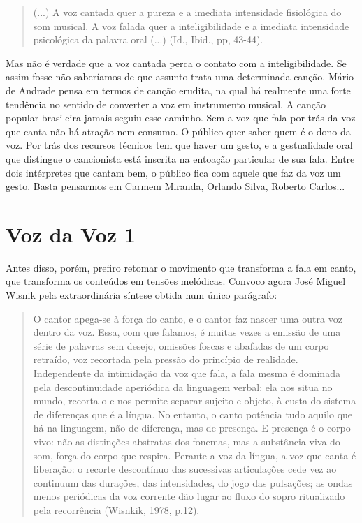 \begin{quote}
(...) A voz cantada quer a pureza e a imediata intensidade fisiológica
do som musical. A voz falada quer a inteligibilidade e a imediata
intensidade psicológica da palavra oral (...) (Id., Ibid., pp, 43-44).
\end{quote}

Mas não é verdade que a voz cantada perca o contato com a
inteligibilidade. Se assim fosse não saberíamos de que assunto trata uma
determinada canção. Mário de Andrade pensa em termos de canção erudita,
na qual há realmente uma forte tendência no sentido de converter a voz
em instrumento musical. A canção popular brasileira jamais seguiu esse
caminho. Sem a voz que fala por trás da voz que canta não há atração nem
consumo. O público quer saber quem é o dono da voz. Por trás dos
recursos técnicos tem que haver um gesto, e a gestualidade oral que
distingue o cancionista está inscrita na entoação particular de sua
fala. Entre dois intérpretes que cantam bem, o público fica com aquele
que faz da voz um gesto. Basta pensarmos em Carmem Miranda, Orlando
Silva, Roberto Carlos...

\section{Voz da Voz 1}

Antes disso, porém, prefiro retomar o movimento que transforma a fala em
canto, que transforma os conteúdos em tensões melódicas. Convoco agora
José Miguel Wisnik pela extraordinária síntese obtida num único
parágrafo:

\begin{quote}
O cantor apega-se à força do canto, e o cantor faz nascer uma outra voz
dentro da voz. Essa, com que falamos, é muitas vezes a emissão de uma
série de palavras sem desejo, omissões foscas e abafadas de um corpo
retraído, voz recortada pela pressão do princípio de realidade.
Independente da intimidação da voz que fala, a fala mesma é dominada
pela descontinuidade aperiódica da linguagem verbal: ela nos situa no
mundo, recorta-o e nos permite separar sujeito e objeto, à custa do
sistema de diferenças que é a língua. No entanto, o canto potência tudo
aquilo que há na linguagem, não de diferença, mas de presença. E
presença é o corpo vivo: não as distinções abstratas dos fonemas, mas a
substância viva do som, força do corpo que respira. Perante a voz da
língua, a voz que canta é liberação: o recorte descontínuo das
sucessivas articulações cede vez ao continuum das durações, das
intensidades, do jogo das pulsações; as ondas menos periódicas da voz
corrente dão lugar ao fluxo do sopro ritualizado pela recorrência
(Wisnkik, 1978, p.12).
\end{quote}

